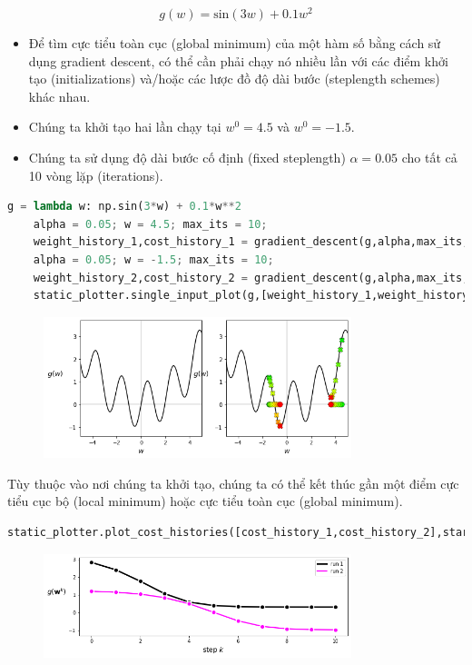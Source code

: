 \documentclass{book}
\begin{document}
\begin{equation*}
    g(w) = \text{sin}(3w) + 0.1w^2
\end{equation*}

\begin{itemize}
    \item Để tìm cực tiểu toàn cục (global minimum) của một hàm số bằng cách sử dụng gradient descent, có thể cần phải chạy nó nhiều lần với các điểm khởi tạo (initializations) và/hoặc các lược đồ độ dài bước (steplength schemes) khác nhau.
    \item Chúng ta khởi tạo hai lần chạy tại $w^0 = 4.5$ và $w^0 = -1.5$.
    \item Chúng ta sử dụng độ dài bước cố định (fixed steplength) $\alpha=0.05$ cho tất cả 10 vòng lặp (iterations).
\end{itemize}

\begin{lstlisting}[language=python]
    g = lambda w: np.sin(3*w) + 0.1*w**2
    alpha = 0.05; w = 4.5; max_its = 10;
    weight_history_1,cost_history_1 = gradient_descent(g,alpha,max_its,w)
    alpha = 0.05; w = -1.5; max_its = 10;
    weight_history_2,cost_history_2 = gradient_descent(g,alpha,max_its,w)
    static_plotter.single_input_plot(g,[weight_history_1,weight_history_2],[cost_history_1,cost_history_2],wmin = -5,wmax = 5)
\end{lstlisting}

\begin{figure}[H]
    \centering
    \includegraphics[width=0.8\textwidth]{images/a_non-convex_single_input_example.png}
\end{figure}
Tùy thuộc vào nơi chúng ta khởi tạo, chúng ta có thể kết thúc gần một điểm cực tiểu cục bộ (local minimum) hoặc cực tiểu toàn cục (global minimum).

\begin{lstlisting}[language=python]
    static_plotter.plot_cost_histories([cost_history_1,cost_history_2],start = 0,points = True,labels = ['run 1','run 2'])
\end{lstlisting}
\begin{figure}[H]
    \centering
    \includegraphics[width=0.8\textwidth]{images/a_non-convex_single_input_example_his.png}
\end{figure}
\end{document}

